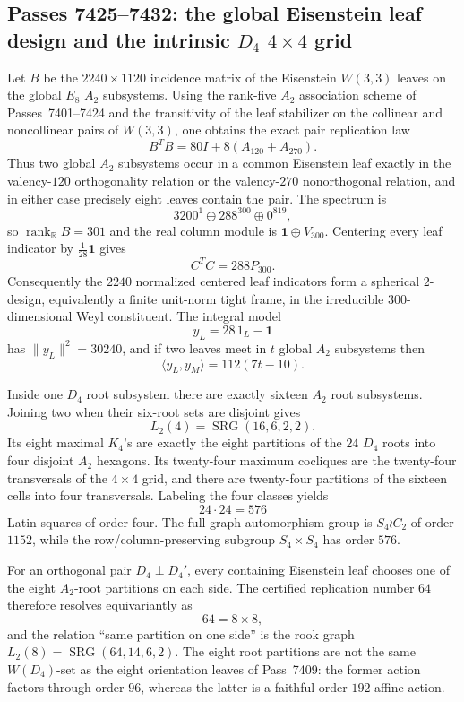\subsection*{Passes 7425--7432: the global Eisenstein leaf design and the intrinsic $D_4$ $4\times4$ grid}

Let $B$ be the $2240\times1120$ incidence matrix of the Eisenstein $W(3,3)$ leaves on the global $E_8$ $A_2$ subsystems.  Using the rank-five $A_2$ association scheme of Passes~7401--7424 and the transitivity of the leaf stabilizer on the collinear and noncollinear pairs of $W(3,3)$, one obtains the exact pair replication law
\[
  \boxed{B^{T}B=80I+8(A_{120}+A_{270})}.
\]
Thus two global $A_2$ subsystems occur in a common Eisenstein leaf exactly in the valency-$120$ orthogonality relation or the valency-$270$ nonorthogonal relation, and in either case precisely eight leaves contain the pair.  The spectrum is
\[
  \boxed{3200^1\oplus288^{300}\oplus0^{819}},
\]
so $\operatorname{rank}_{\mathbb R}B=301$ and the real column module is $\mathbf1\oplus V_{300}$.  Centering every leaf indicator by $\frac1{28}\mathbf1$ gives
\[
  \boxed{C^TC=288P_{300}}.
\]
Consequently the $2240$ normalized centered leaf indicators form a spherical $2$-design, equivalently a finite unit-norm tight frame, in the irreducible $300$-dimensional Weyl constituent.  The integral model
\[
  y_L=28\,1_L-\mathbf1
\]
has $\|y_L\|^2=30240$, and if two leaves meet in $t$ global $A_2$ subsystems then
\[
  \boxed{\langle y_L,y_M\rangle=112(7t-10)}.
\]

Inside one $D_4$ root subsystem there are exactly sixteen $A_2$ root subsystems.  Joining two when their six-root sets are disjoint gives
\[
  \boxed{L_2(4)=\operatorname{SRG}(16,6,2,2)}.
\]
Its eight maximal $K_4$'s are exactly the eight partitions of the $24$ $D_4$ roots into four disjoint $A_2$ hexagons.  Its twenty-four maximum cocliques are the twenty-four transversals of the $4\times4$ grid, and there are twenty-four partitions of the sixteen cells into four transversals.  Labeling the four classes yields
\[
  \boxed{24\cdot24=576}
\]
Latin squares of order four.  The full graph automorphism group is $S_4\wr C_2$ of order $1152$, while the row/column-preserving subgroup $S_4\times S_4$ has order $576$.

For an orthogonal pair $D_4\perp D_4'$, every containing Eisenstein leaf chooses one of the eight $A_2$-root partitions on each side.  The certified replication number $64$ therefore resolves equivariantly as
\[
  \boxed{64=8\times8},
\]
and the relation ``same partition on one side'' is the rook graph $L_2(8)=\operatorname{SRG}(64,14,6,2)$.  The eight root partitions are not the same $W(D_4)$-set as the eight orientation leaves of Pass~7409: the former action factors through order $96$, whereas the latter is a faithful order-$192$ affine action.

